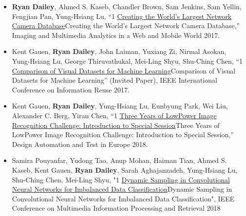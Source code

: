 \documentclass[10pt]{article}
\newlength{\cvcolumngapwidth}
\newlength{\cvleftcolumnwidth}
\newlength{\cvrightcolumnwidth}
\newcommand{\cvdurationstyle}[1]{{\small\cvdurationfont\textcolor{cvdurationcolor}{#1}}}
\newlength{\cvafteritemskipamount}
\newlength{\cvparskip}
\newcommand{\cvitem}[2]{
    \begin{minipage}[t]{\cvleftcolumnwidth}
        \raggedleft #1
    \end{minipage}%
    \hspace{\cvcolumngapwidth}%
    \begin{minipage}[t]{\cvrightcolumnwidth}
        \setlength{\parskip}{\cvparskip} #2
    \end{minipage}

    \vspace{\cvafteritemskipamount}
}
\def\online{1}
\def\cv{0}
\begin{document}
\cvitem{
    \cvdurationstyle{}
}{
    \begin{itemize}[leftmargin=*]
        \item \textbf{Ryan Dailey}, Ahmed S. Kaseb, Chandler Brown, Sam Jenkins, Sam Yellin, Fengjian Pan, Yung-Hsiang Lu, “\if\online1 \href{https://drive.google.com/open?id=1479pCURB0qsDXMOfdWBarYYTbIyrDcYf}{Creating the World’s Largest Network Camera Database}\else Creating the World’s Largest Network Camera Database\fi,” Imaging and Multimedia Analytics in a Web and Mobile World 2017.
        \item Kent Gauen, \textbf{Ryan Dailey}, John Laiman, Yuxiang Zi, Nirmal Asokan, Yung-Hsiang Lu, George Thiruvathukal, Mei-Ling Shyu, Shu-Ching Chen, “\if\online1 \href{https://drive.google.com/open?id=1YFEIxjftRhNtgMDuUe9-cY8GJ_6H00yZ}{Comparison of Visual Datasets for Machine Learning}\else Comparison of Visual Datasets for Machine Learning\fi” (Invited Paper), IEEE International Conference on Information Reuse 2017.
        \item Kent Gauen, \textbf{Ryan Dailey}, Yung-Hsiang Lu, Eunbyung Park, Wei Liu, Alexander C. Berg, Yiran Chen, “\if\online1 \href{https://drive.google.com/open?id=1ZV4mC7vhHB9v9lOCJ_r946EbLbhj4Nus}{Three Years of LowPower Image Recognition Challenge: Introduction to Special Session}\else Three Years of LowPower Image Recognition Challenge: Introduction to Special Session\fi,” Design Automation and Test in Europe 2018.
        \item Samira Pouyanfar, Yudong Tao, Anup Mohan, Haiman Tian, Ahmed S. Kaseb, Kent Gauen, \textbf{Ryan Dailey}, Sarah Aghajanzadeh, Yung-Hsiang Lu, Shu-Ching Chen, Mei-Ling Shyu, "\if\online1 \href{https://drive.google.com/open?id=1MIHxzYJoPLmKy7OXyZUhjhRnKTiDwypx}{Dynamic Sampling in Convolutional Neural Networks for Imbalanced Data Classification}\else Dynamic Sampling in Convolutional Neural Networks for Imbalanced Data Classification\fi", IEEE Conference on Multimedia Information Processing and Retrieval 2018
    \end{itemize}
}
\end{document}
